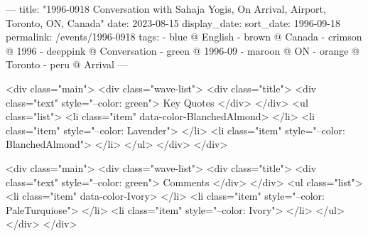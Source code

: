 ---
title: "1996-0918 Conversation with Sahaja Yogis, On Arrival, Airport, Toronto, ON, Canada"
date: 2023-08-15
display_date: 
sort_date: 1996-09-18
permalink: /events/1996-0918
tags:
  - blue @ English
  - brown @ Canada
  - crimson @ 1996
  - deeppink @ Conversation
  - green @ 1996-09
  - maroon @ ON
  - orange @ Toronto
  - peru @ Arrival
---

<div class="main">
  <div class="wave-list">
    <div class="title">
      <div class="text" style="--color: green">
        Key Quotes
      </div>
    </div>
    <ul class="list">
        <li class="item" data-color-BlanchedAlmond>
        </li>
        <li class="item" style="--color: Lavender">
        </li>
        <li class="item" style="--color: BlanchedAlmond">
        </li>
      </ul>
  </div>
</div>

<div class="main">
  <div class="wave-list">
    <div class="title">
      <div class="text" style="--color: green">
        Comments
      </div>
    </div>
    <ul class="list">
        <li class="item" data-color-Ivory>
        </li>
        <li class="item" style="--color: PaleTurquiose">
        </li>
        <li class="item" style="--color: Ivory">
        </li>
      </ul>
  </div>
</div>